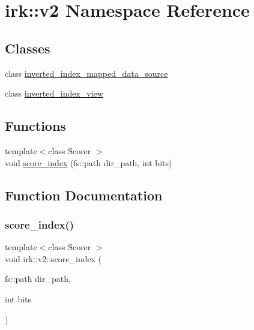 \hypertarget{namespaceirk_1_1v2}{}\section{irk\+:\+:v2 Namespace Reference}
\label{namespaceirk_1_1v2}
\subsection*{Classes}
\begin{DoxyCompactItemize}
\item 
class \mbox{\hyperlink{classirk_1_1v2_1_1inverted__index__mapped__data__source}{inverted\+\_\+index\+\_\+mapped\+\_\+data\+\_\+source}}
\item 
class \mbox{\hyperlink{classirk_1_1v2_1_1inverted__index__view}{inverted\+\_\+index\+\_\+view}}
\end{DoxyCompactItemize}
\subsection*{Functions}
\begin{DoxyCompactItemize}
\item 
{\footnotesize template$<$class Scorer $>$ }\\void \mbox{\hyperlink{namespaceirk_1_1v2_a7bd9312938eb7a79b39c30fe6d56bee4}{score\+\_\+index}} (fs\+::path dir\+\_\+path, int bits)
\end{DoxyCompactItemize}


\subsection{Function Documentation}
\mbox{\label{namespaceirk_1_1v2_a7bd9312938eb7a79b39c30fe6d56bee4}} 
\subsubsection{\texorpdfstring{score\+\_\+index()}{score\_index()}}
{\footnotesize\ttfamily template$<$class Scorer $>$ \\
void irk\+::v2\+::score\+\_\+index (\begin{DoxyParamCaption}\item[{fs\+::path}]{dir\+\_\+path,  }\item[{int}]{bits }\end{DoxyParamCaption})}

